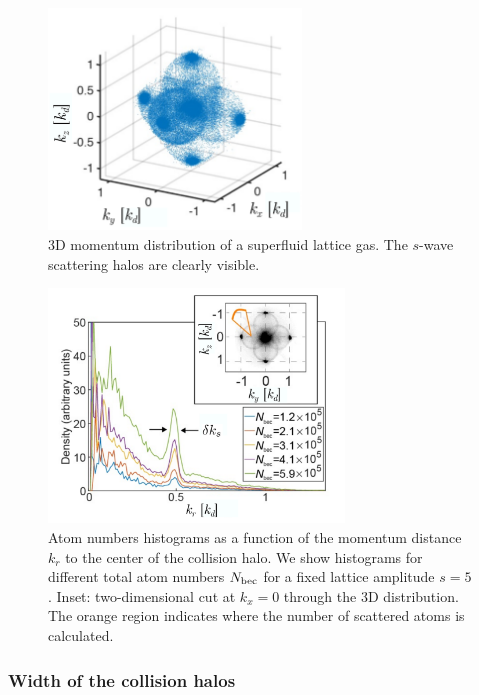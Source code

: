 \begin{figure}
    \centering
    \includegraphics[width=0.6\textwidth]{Fig/Chapter3/spheres.png}
    \caption[Collision halos in the 3D momentum distribution of a superfluid lattice gas]{3D momentum distribution of a superfluid lattice gas. The $s$-wave scattering halos are clearly visible.}
    \label{fig:spheres}
\end{figure}

\begin{figure}
    \centering
    \includegraphics[width=0.7\textwidth]{Fig/Chapter3/sphere_profiles.png}
    \caption[Atom numbers histograms as a function of the momentum distance $k_r$ to the center of the collision halo]{Atom numbers histograms as a function of the momentum distance $k_r$ to the center of the collision halo. We show histograms for different total atom numbers $N_{\rm{bec}}$ for a fixed lattice amplitude $s=5$. Inset: two-dimensional cut at $k_x=0$ through the 3D distribution. The orange region indicates where the number of scattered atoms is calculated.}
    \label{fig:sphere_profiles}
\end{figure}

\subsubsection{Width of the collision halos}

